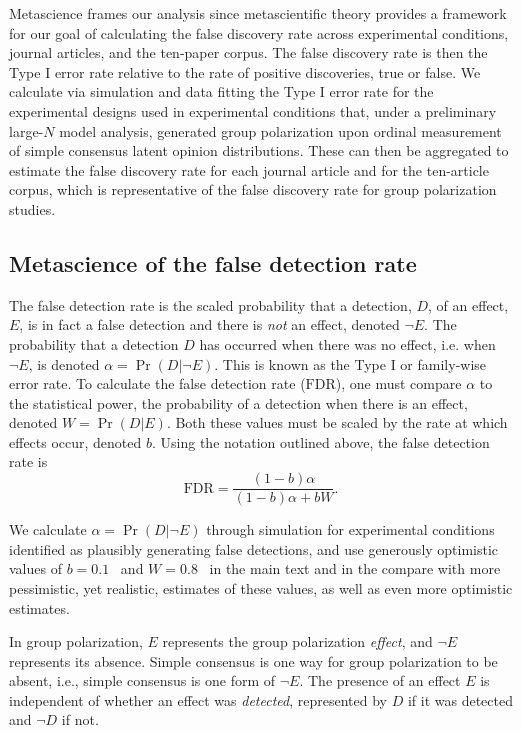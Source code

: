 \documentclass[
  abstract]{article}
\newcommand{\fdr}{\mathrm{FDR}}
\begin{document}
Metascience frames our analysis since metascientific theory provides a framework for
our goal of calculating the false discovery rate across experimental conditions,
journal articles, and the ten-paper corpus. The false discovery rate is then
the Type I error rate relative to the rate of positive discoveries, true or false.
We calculate via simulation and data fitting
the Type I error rate for the experimental designs used in experimental conditions
that, under a preliminary large-$N$ model analysis, generated group
polarization upon ordinal measurement of simple consensus latent opinion 
distributions. These can then be aggregated to estimate the false discovery rate
for each journal article and for the ten-article corpus, which is representative of the
false discovery rate for group polarization studies. 

\subsection{Metascience of the false detection rate}

The false detection rate is the scaled probability that a detection, $D$, of
an effect, $E$, is in fact a false detection and there is \emph{not} an effect,
denoted $\neg E$. The probability that a detection $D$ has occurred when there
was no effect, i.e. when $\neg E$, is denoted $\alpha = \Pr(D | \neg E)$.
This is known as the Type I or family-wise error rate. To calculate the 
false detection rate ($\fdr$), one must compare $\alpha$ to the statistical power,
the probability of a detection when there is an effect, denoted $W = \Pr(D | E)$.
Both these values must be scaled by the rate at which effects occur, denoted $b$.
Using the notation outlined above, the false detection rate is
\begin{equation}
  \fdr = \frac{(1 - b)\alpha}{(1 - b)\alpha + bW}.
\end{equation}

We calculate $\alpha = \Pr(D | \neg E)$ through simulation for experimental
conditions identified as plausibly generating false detections, 
and use generously optimistic values of
$b=0.1$~\cite{Ioannidis2005,McElreath2015} and $W=0.8$~\cite{Smaldino2016NatSel}
in the main text and in the compare with more pessimistic, yet realistic, estimates
of these values, as well as even more optimistic estimates. 

In group polarization, $E$ represents the group polarization \emph{effect}, and
$\neg E$ represents its absence. Simple consensus is one way for group polarization
to be absent, i.e., simple consensus is one form of $\neg E$. The presence of
an effect $E$ is independent of whether an effect was \emph{detected}, 
represented by $D$ if it was detected and $\neg D$ if not. 
\end{document}
